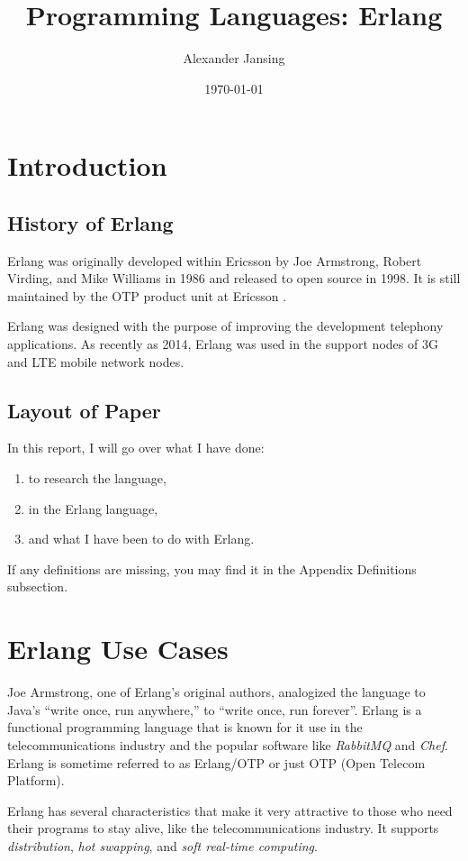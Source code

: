 \documentclass[11 pt]{IEEEtran}
\title{Programming Languages: Erlang}
\author{Alexander Jansing}
\date{\today}
\begin{document}
\maketitle


\section{Introduction}
\subsection{History of Erlang}
Erlang was originally developed within Ericsson by Joe Armstrong, Robert Virding, and Mike Williams in 1986 and released to open source in 1998. It is still maintained by the OTP product unit at Ericsson \cite{wiki}. 

Erlang was designed with the purpose of improving the development telephony applications. As recently as 2014, Erlang was used in the support nodes of 3G and LTE mobile network nodes\cite{wiki}\cite{inside-erlang}.

\subsection{Layout of Paper}
In this report, I will go over what I have done:
\begin{enumerate}
\item to research the language,
\item in the Erlang language,
\item and what I have been to do with Erlang.
\end{enumerate}

If any definitions are missing, you may find it in the Appendix Definitions subsection.

\section{Erlang Use Cases}
Joe Armstrong, one of Erlang's original authors, analogized the language to Java's ``write once, run anywhere,'' to ``write once, run forever''\cite{run-forever}. Erlang is a functional programming language that is known for it use in the telecommunications industry and the popular software like \emph{RabbitMQ}\cite{ribbitmq-wiki} and \emph{Chef}\cite{chef-wiki}. Erlang is sometime referred to as Erlang/OTP or just OTP (Open Telecom Platform).

Erlang has several characteristics that make it very attractive to those who need their programs to stay alive, like the telecommunications industry. It supports \emph{distribution}, \emph{hot swapping}, and \emph{soft real-time computing}.
\end{document}
